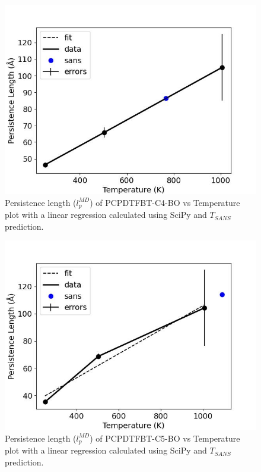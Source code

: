 \begin{figure}
    \centering
    \includegraphics[width=1\linewidth]{src/figures/pers_l_figs/untitled folder/pcpdtfbt/c4_plot.jpeg}
    \caption{Persistence length ($l_p^{MD}$) of PCPDTFBT-C4-BO vs Temperature plot with a linear regression calculated using SciPy \citep{2020SciPy-NMeth} and $T_{SANS}$ prediction.}
    \label{fig:C4_plot}
\end{figure}

\begin{figure}
    \centering
    \includegraphics[width=1\linewidth]{src/figures/pers_l_figs/untitled folder/pcpdtfbt/C5_plot.jpeg}
    \caption{Persistence length ($l_p^{MD}$) of PCPDTFBT-C5-BO vs Temperature plot with a linear regression calculated using SciPy \citep{2020SciPy-NMeth} and $T_{SANS}$ prediction.}
    \label{fig:C5_plot}
\end{figure}

